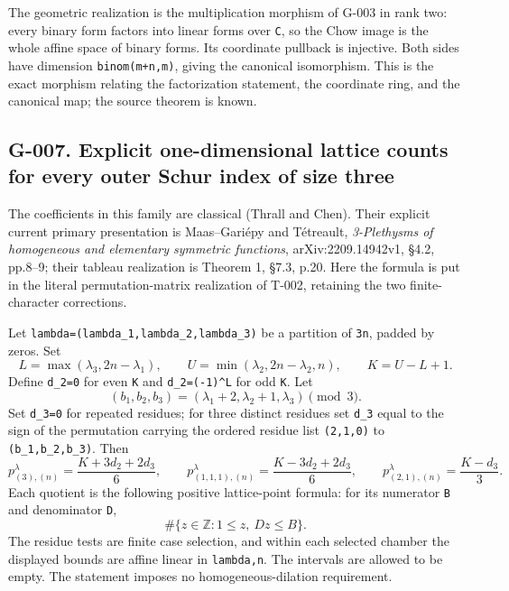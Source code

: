 \documentclass[
  10pt,
]{article}
\begin{document}
The geometric realization is the multiplication morphism of G-003 in
rank two: every binary form factors into linear forms over
\texttt{\small C}, so the Chow image is the whole affine space of binary
forms. Its coordinate pullback is injective. Both sides have dimension
\texttt{\small binom(\allowbreak{}m+\allowbreak{}n,\allowbreak{}m)\allowbreak{}},
giving the canonical isomorphism. This is the exact morphism relating
the factorization statement, the coordinate ring, and the canonical map;
the source theorem is known.

\subsection{G-007. Explicit one-dimensional lattice counts for every
outer Schur index of size
three}\label{g-007.-explicit-one-dimensional-lattice-counts-for-every-outer-schur-index-of-size-three}

The coefficients in this family are classical (Thrall and Chen). Their
explicit current primary presentation is Maas--Gariépy and Tétreault,
\emph{3-Plethysms of homogeneous and elementary symmetric functions},
arXiv:2209.14942v1, §4.2, pp.8--9; their tableau realization is Theorem
1, §7.3, p.20. Here the formula is put in the literal permutation-matrix
realization of T-002, retaining the two finite-character corrections.

Let
\texttt{\small lambda=\allowbreak{}(\allowbreak{}lambda\_\allowbreak{}1,\allowbreak{}lambda\_\allowbreak{}2,\allowbreak{}lambda\_\allowbreak{}3)\allowbreak{}}
be a partition of \texttt{\small 3n}, padded by zeros. Set \[
L=\max(\lambda_3,2n-\lambda_1),\qquad
U=\min(\lambda_2,2n-\lambda_2,n),\qquad K=U-L+1.
\] Define \texttt{\small d\_\allowbreak{}2=\allowbreak{}0} for even
\texttt{\small K} and
\texttt{\small d\_\allowbreak{}2=\allowbreak{}(\allowbreak{}-\allowbreak{}1)\allowbreak{}\textasciicircum{}L}
for odd \texttt{\small K}. Let \[
(b_1,b_2,b_3)=(\lambda_1+2,\lambda_2+1,\lambda_3)\pmod3.
\] Set \texttt{\small d\_\allowbreak{}3=\allowbreak{}0} for repeated
residues; for three distinct residues set
\texttt{\small d\_\allowbreak{}3} equal to the sign of the permutation
carrying the ordered residue list
\texttt{\small (\allowbreak{}2,\allowbreak{}1,\allowbreak{}0)\allowbreak{}}
to
\texttt{\small (\allowbreak{}b\_\allowbreak{}1,\allowbreak{}b\_\allowbreak{}2,\allowbreak{}b\_\allowbreak{}3)\allowbreak{}}.
Then \[
p_{(3),(n)}^{\lambda}=\frac{K+3d_2+2d_3}{6},\qquad
p_{(1,1,1),(n)}^{\lambda}=\frac{K-3d_2+2d_3}{6},\qquad
p_{(2,1),(n)}^{\lambda}=\frac{K-d_3}{3}.
\tag{G7.1}
\] Each quotient is the following positive lattice-point formula: for
its numerator \texttt{\small B} and denominator \texttt{\small D}, \[
\boxed{\#\{z\in\mathbb Z:1\le z,\ Dz\le B\}.}
\tag{G7.2}
\] The residue tests are finite case selection, and within each selected
chamber the displayed bounds are affine linear in
\texttt{\small lambda,\allowbreak{}n}. The intervals are allowed to be
empty. The statement imposes no homogeneous-dilation requirement.
\end{document}
